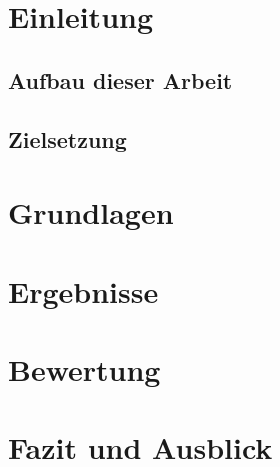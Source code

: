 \setcounter{section}{0}

\section{Einleitung}



\subsection{Aufbau dieser Arbeit}



\subsection{Zielsetzung}



\section{Grundlagen}



\section{Ergebnisse}



\section{Bewertung}



\section{Fazit und Ausblick}

